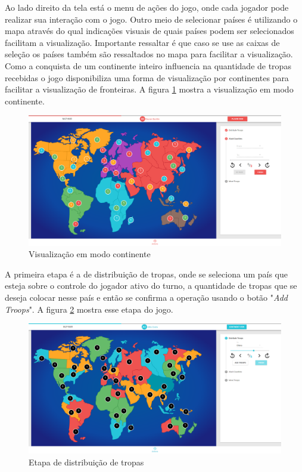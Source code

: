 \documentclass[rel_mlp]{iiufrgs}
\begin{document}
Ao lado direito da tela está o menu de ações do jogo, onde cada jogador pode realizar sua interação com o jogo. Outro meio de selecionar países é utilizando o mapa através do qual indicações visuais de quais países podem ser selecionados facilitam a visualização. Importante ressaltar é que caso se use as caixas de seleção os países também são ressaltados no mapa para facilitar a visualização.
Como a conquista de um continente inteiro influencia na quantidade de tropas recebidas o jogo disponibiliza uma forma de visualização por continentes para facilitar a visualização de fronteiras.
A figura \ref{fig:continentView} mostra a visualização em modo continente.

\begin{figure}[h!]
\centering
  \includegraphics[width=1.0\textwidth]{images/continentView.png}
  \caption{Visualização em modo continente}
  \label{fig:continentView}
\end{figure}

A primeira etapa é a de distribuição de tropas, onde se seleciona um país que esteja sobre o controle do jogador ativo do turno, a quantidade de tropas que se deseja colocar nesse país e então se confirma a operação usando o botão "\textit{Add Troops}".
A figura \ref{fig:distribution} mostra esse etapa do jogo.

\begin{figure}[h!]
\centering
  \includegraphics[width=1.0\textwidth]{images/distribution.png}
  \caption{Etapa de distribuição de tropas}
  \label{fig:distribution}
\end{figure}
\end{document}
